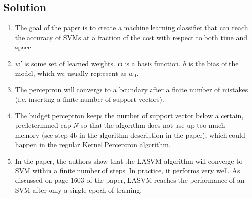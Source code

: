 \documentclass[submit]{harvardml}
\begin{document}
\subsection*{Solution}
\begin{enumerate}
	\item The goal of the paper is to create a machine learning classifier that can reach the accuracy of SVMs at a fraction of the cost with respect to both time and space. 
	
	\item $w'$ is some set of learned weights.  $\mathbf{\phi}$ is a basis function.  $b$ is the bias of the model, which we usually represent as $w_0$. 
	
	\item The perceptron will converge to a boundary after a finite number of mistakes (i.e. inserting a finite number of support vectors). 
	
	\item The budget perceptron keeps the number of support vector below a certain, predetermined cap $N$ so that the algorithm does not use up too much memory (see step 4b in the algorithm description in the paper), which could happen in the regular Kernel Perceptron algorithm.  
	
	\item In the paper, the authors show that the LASVM algorithm will converge to SVM within a finite number of steps.  In practice, it performs very well. As discussed on page 1603 of the paper, LASVM reaches the performance of an SVM after only a single epoch of training.  
	

\end{enumerate}
\end{document}
